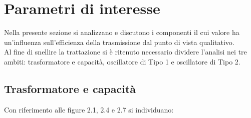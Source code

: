 \documentclass[a4paper, 12pt]{memoir}
\begin{document}
\section{Parametri di interesse}
Nella presente sezione si analizzano e discutono i componenti il cui valore ha
un'influenza sull'efficienza della trasmissione dal punto di vista qualitativo.
\\Al fine di snellire la trattazione si è ritenuto necessario dividere 
l'analisi nei tre ambiti: trasformatore e capacità, oscillatore di Tipo 1 e
oscillatore di Tipo 2.

\subsection{Trasformatore e capacità}
Con riferimento alle figure 2.1, 2.4 e 2.7 si individuano:
\end{document}
